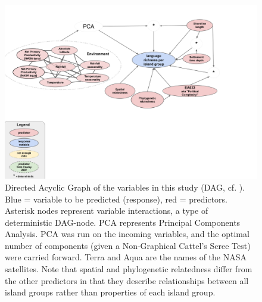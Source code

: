 \documentclass[unnumsec,webpdf,modern,medium]{oup-authoring-template}
\begin{document}




\begin{figure}[!ht]
\centering
\includegraphics[width=\textwidth]{Predicting_lgs_DAG_slimmed.png}
\caption{Directed Acyclic Graph of the variables in this study (DAG, cf. \cite{mcelreath2020statistical}). Blue = variable to be predicted (response), red = predictors. Asterisk nodes represent variable interactions, a type of deterministic DAG-node. PCA represents Principal Components Analysis. PCA was run on the incoming variables, and the optimal number of components (given a Non-Graphical Cattel's Scree Test) were carried forward. Terra and Aqua are the names of the NASA satellites. Note that spatial and phylogenetic relatedness differ from the other predictors in that they describe relationships between all island groups rather than properties of each island group.}
\label{appendix_Predicting_lgs_DAG_slimmed}
\end{figure}


\newpage
\end{document}
